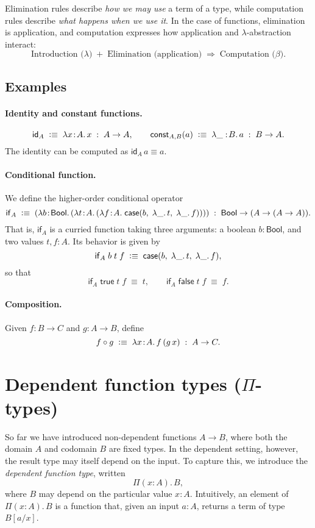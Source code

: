 \documentclass{article}
\newcommand{\defeq}{\vcentcolon\equiv}
\newcommand{\caseof}{\mathsf{case}}
\newcommand{\Bool}{\mathsf{Bool}}
\newcommand{\jdeq}{\equiv}                 %
\begin{document}
Elimination rules describe \emph{how we may use} a term of a type,
while computation rules describe \emph{what happens when we use it}.
In the case of functions, elimination is application,
and computation expresses how application and $\lambda$-abstraction interact:
\[
\text{Introduction (}\lambda\text{)} \;+\; \text{Elimination (application)} \;\Rightarrow\; \text{Computation (}\beta\text{)}.
\]

\subsection*{Examples}

\paragraph{Identity and constant functions.}
\[
\mathsf{id}_A \;\defeq\; \lambda x\!:\!A.\,x \;:\; A \to A,
\qquad
\mathsf{const}_{A,B}(a) \;\defeq\; \lambda \_:\!B.\,a \;:\; B \to A.
\]
The identity can be computed as \(\mathsf{id}_A\,a \jdeq a\).

\paragraph{Conditional function.}
We define the higher-order conditional operator
\[
\mathsf{if}_A
\;\defeq\;
(\lambda b\!:\!\Bool.\,
  (\lambda t\!:\!A.\,
    (\lambda f\!:\!A.\;
      \caseof(b,\; \lambda\_.\,t,\; \lambda\_.\,f))))
\;:\;
\Bool \to (A \to (A \to A)).
\]
That is, \(\mathsf{if}_A\) is a curried function taking three arguments:
a boolean \(b:\Bool\), and two values \(t,f:A\).
Its behavior is given by
\[
\mathsf{if}_A \; b \; t \; f
\;\defeq\;
\caseof(b,\; \lambda\_.\,t,\; \lambda\_.\,f),
\]
so that
\[
\mathsf{if}_A \; \mathsf{true} \; t \; f \;\jdeq\; t,
\qquad
\mathsf{if}_A \; \mathsf{false} \;t \; f \;\jdeq\; f.
\]


\paragraph{Composition.}
Given \(f:B\to C\) and \(g:A\to B\), define
\[
f \circ g \;\defeq\; \lambda x\!:\!A.\, f\,(g\,x) \;:\; A \to C.
\]

\section{Dependent function types (\texorpdfstring{$\Pi$}{Pi}-types)}

So far we have introduced non-dependent functions \(A \to B\), where both the domain \(A\)
and codomain \(B\) are fixed types.  
In the dependent setting, however, the result type may itself depend on the input.
To capture this, we introduce the \emph{dependent function type}, written
\[
\Pi(x\!:\!A).\,B,
\]
where \(B\) may depend on the particular value \(x:A\).
Intuitively, an element of \(\Pi(x\!:\!A).\,B\) is a function that, given an input \(a:A\),
returns a term of type \(B[a/x]\).
\end{document}
